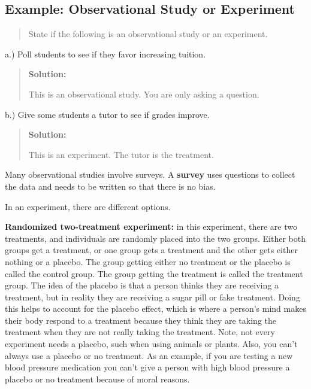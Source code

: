 \documentclass[]{book}
\begin{document}
\hypertarget{example-observational-study-or-experiment}{%
\subsection{Example: Observational Study or Experiment}\label{example-observational-study-or-experiment}}

\begin{quote}
State if the following is an observational study or an experiment.
\end{quote}

a.) Poll students to see if they favor increasing tuition.

\begin{quote}
\textbf{Solution:}

This is an observational study. You are only asking a question.
\end{quote}

b.) Give some students a tutor to see if grades improve.

\begin{quote}
\textbf{Solution:}

This is an experiment. The tutor is the treatment.
\end{quote}

Many observational studies involve surveys. A \textbf{survey} uses questions to collect the data and needs to be written so that there is no bias.

In an experiment, there are different options.

\textbf{Randomized two-treatment experiment:} in this experiment, there are two treatments, and individuals are randomly placed into the two groups. Either both groups get a treatment, or one group gets a treatment and the other gets either nothing or a placebo. The group getting either no treatment or the placebo is called the control group. The group getting the treatment is called the treatment group. The idea of the placebo is that a person thinks they are receiving a treatment, but in reality they are receiving a sugar pill or fake treatment. Doing this helps to account for the placebo effect, which is where a person's mind makes their body respond to a treatment because they think they are taking the
treatment when they are not really taking the treatment. Note, not every experiment needs a placebo, such when using animals or plants. Also, you can't always use a placebo or no treatment. As an example, if you are testing a new blood pressure medication you can't give a person with high blood pressure a placebo or no treatment because of moral reasons.
\end{document}
